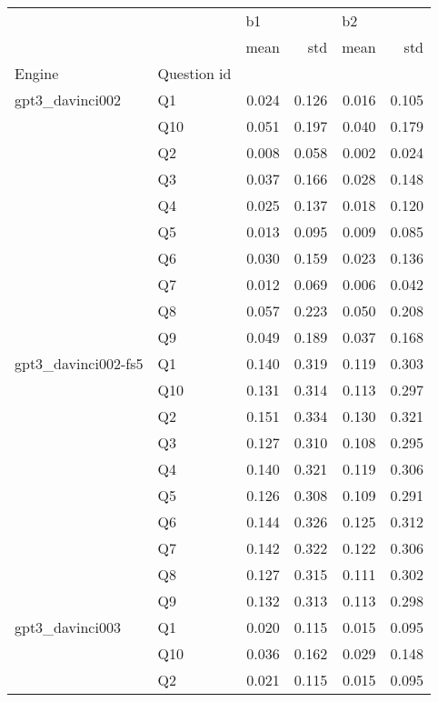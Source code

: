\begin{tabular}{llrrrr}
\toprule
                &   & \multicolumn{2}{l}{b1} & \multicolumn{2}{l}{b2} \\
                &   &  mean &   std &  mean &   std \\
Engine & Question id &       &       &       &       \\
\midrule
gpt3\_davinci002 & Q1 & 0.024 & 0.126 & 0.016 & 0.105 \\
                & Q10 & 0.051 & 0.197 & 0.040 & 0.179 \\
                & Q2 & 0.008 & 0.058 & 0.002 & 0.024 \\
                & Q3 & 0.037 & 0.166 & 0.028 & 0.148 \\
                & Q4 & 0.025 & 0.137 & 0.018 & 0.120 \\
                & Q5 & 0.013 & 0.095 & 0.009 & 0.085 \\
                & Q6 & 0.030 & 0.159 & 0.023 & 0.136 \\
                & Q7 & 0.012 & 0.069 & 0.006 & 0.042 \\
                & Q8 & 0.057 & 0.223 & 0.050 & 0.208 \\
                & Q9 & 0.049 & 0.189 & 0.037 & 0.168 \\
gpt3\_davinci002-fs5 & Q1 & 0.140 & 0.319 & 0.119 & 0.303 \\
                & Q10 & 0.131 & 0.314 & 0.113 & 0.297 \\
                & Q2 & 0.151 & 0.334 & 0.130 & 0.321 \\
                & Q3 & 0.127 & 0.310 & 0.108 & 0.295 \\
                & Q4 & 0.140 & 0.321 & 0.119 & 0.306 \\
                & Q5 & 0.126 & 0.308 & 0.109 & 0.291 \\
                & Q6 & 0.144 & 0.326 & 0.125 & 0.312 \\
                & Q7 & 0.142 & 0.322 & 0.122 & 0.306 \\
                & Q8 & 0.127 & 0.315 & 0.111 & 0.302 \\
                & Q9 & 0.132 & 0.313 & 0.113 & 0.298 \\
gpt3\_davinci003 & Q1 & 0.020 & 0.115 & 0.015 & 0.095 \\
                & Q10 & 0.036 & 0.162 & 0.029 & 0.148 \\
                & Q2 & 0.021 & 0.115 & 0.015 & 0.095 \\

\end{tabular}
